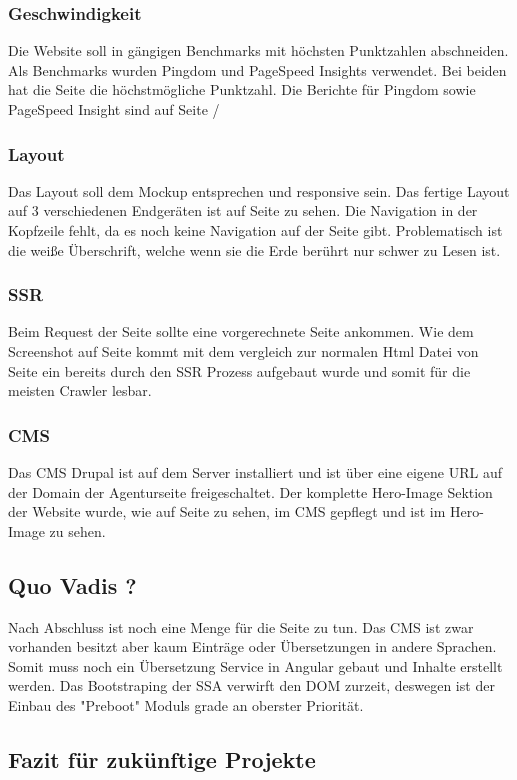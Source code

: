 \documentclass[11pt,a4paper]{article}
\begin{document}
\subsubsection{Geschwindigkeit}
Die Website soll in gängigen Benchmarks mit höchsten Punktzahlen abschneiden.
Als Benchmarks wurden Pingdom und PageSpeed Insights verwendet.
Bei beiden hat die Seite die höchstmögliche Punktzahl.
Die Berichte für Pingdom sowie PageSpeed Insight sind auf Seite  \pageref{sec:google}/\pageref{sec:pingdom}
\subsubsection{Layout}
Das Layout soll dem Mockup entsprechen und responsive sein. 
Das fertige Layout auf 3 verschiedenen Endgeräten ist auf Seite  %
zu sehen. Die Navigation in der Kopfzeile fehlt, da es noch keine Navigation auf der Seite gibt.
Problematisch ist die weiße Überschrift, welche wenn sie die Erde berührt nur schwer zu Lesen ist.
\subsubsection{SSR}
Beim Request der Seite sollte eine vorgerechnete Seite ankommen. Wie dem Screenshot auf Seite %
kommt mit dem vergleich zur normalen Html Datei von Seite %
ein bereits durch den \acs{SSR} Prozess aufgebaut wurde und somit für die meisten Crawler lesbar.
\subsubsection{CMS}
Das \acs{CMS} Drupal ist auf dem Server installiert und ist über eine eigene URL auf der Domain der Agenturseite freigeschaltet.
Der komplette Hero-Image Sektion der Website wurde, wie auf Seite %
 zu sehen, im CMS gepflegt und ist im Hero-Image zu sehen.
\subsection{Quo Vadis ?}
Nach Abschluss ist noch eine Menge für die Seite zu tun.
Das CMS  ist zwar vorhanden besitzt aber kaum Einträge oder Übersetzungen in andere Sprachen.
Somit muss noch ein Übersetzung Service in Angular gebaut und Inhalte erstellt werden. Das Bootstraping der SSA verwirft den DOM zurzeit, deswegen ist der Einbau des "Preboot" Moduls grade an oberster Priorität.
\subsection{Fazit für zukünftige Projekte}
\newpage
\appendix
\end{document}
